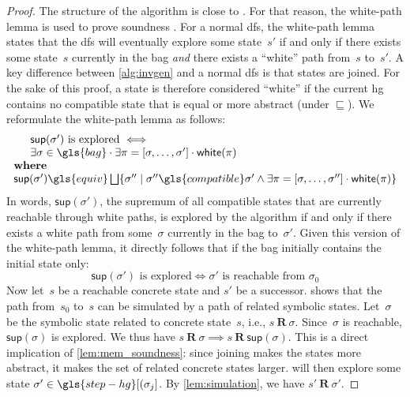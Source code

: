 \begin{proof}
  The structure of the algorithm is close to .
  For that reason, the white-path lemma is used to prove soundness \autocite{cormen2009introduction}.
  For a normal \ac{dfs}, the white-path lemma states that the \ac{dfs} will eventually explore some state~$s'$ if and only if there exists some state~$s$ currently in the bag \emph{and} there exists a ``white'' path from~$s$ to~$s'$.
  A key difference between \cref{alg:invgen} and a normal \ac{dfs} is that states are joined.
  For the sake of this proof, a state is therefore considered ``white'' if the current \ac{hg} contains no compatible state that is equal or more abstract (under $\sqsubseteq$).
  We reformulate the white-path lemma as follows:
  \begin{equation*}
    \begin{array}{l}
      \indent\mathsf{sup}(\sigma') \text{ is explored } \Longleftrightarrow \\
      \indent\exists \sigma \in\gls{bag}\sepdot \exists \pi = [\sigma, \dotsc, \sigma'] \sepdot \mathsf{white}(\pi)
      \\
      \textbf{where}
      \\
      \mathsf{sup}(\sigma') \gls{equiv} \bigsqcup \{ \sigma'' \mid \sigma''\gls{compatible}\sigma' \wedge \exists \pi = [\sigma, \dotsc, \sigma''] \sepdot \mathsf{white}(\pi) \}
    \end{array}
  \end{equation*}
  In words, $\mathsf{sup}(\sigma')$, the supremum of all compatible states that are currently reachable through white paths, is explored by the algorithm if and only if there exists a white path from some~$\sigma$ currently in the bag to~$\sigma'$.
  Given this version of the white-path lemma, it directly follows that if the bag initially contains the initial state only:
  \begin{equation*}
    \mathsf{sup}(\sigma') \mbox{~is explored} \Longleftrightarrow \sigma' \mbox{~is reachable from $\sigma_0$}
  \end{equation*}
  Now let~$s$ be a reachable concrete state and $s'$ be a successor.
   shows that the path from~$s_0$ to~$s$ can be simulated by a path of related symbolic states.
  Let~$\sigma$ be the symbolic state related to concrete state~$s$, i.e., $s~\mathbf{R}~\sigma$.
  Since~$\sigma$ is reachable, $\mathsf{sup}(\sigma)$ is explored.
  We thus have
  $s~\mathbf{R}~\sigma \implies s~\mathbf{R}~\mathsf{sup}(\sigma)$.
  This is a direct implication of \cref{lem:mem_soundness}: since joining makes the states more abstract, it makes the set of related concrete states larger.
   will then explore some state $\sigma' \in \gls{step-hg}[(\sigma_j]$.
  By \cref{lem:simulation}, we have $s'~\mathbf{R}~\sigma'$.
\end{proof}


